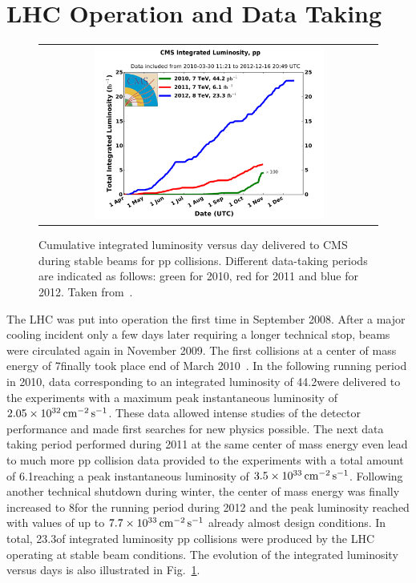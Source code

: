 \section{LHC Operation and Data Taking}
\label{sec:data}
\begin{figure}[!tp]
  \centering
  \begin{tabular}{c}
    \includegraphics[width=0.7\textwidth]{figures/int_lumi_cumulative_pp_2.pdf}
  \end{tabular}
  \caption{Cumulative integrated luminosity versus day delivered to CMS during stable beams for pp collisions. Different data-taking periods are indicated as follows: green for 2010, red for 2011 and blue for 2012. Taken from~\cite{bib:lhc:lumi12}.}
  \label{fig:lhc_data}
\end{figure}
The LHC was put into operation the first time in September 2008. After a major cooling incident only a few days later requiring a longer technical stop, beams were circulated again in November 2009. The first collisions at a center of mass energy of 7\tev finally took place end of March 2010~\cite{bib:lhcmachineoutreach}. In the following running period in 2010, data corresponding to an integrated luminosity of 44.2\pbinv were delivered to the experiments with a maximum peak instantaneous luminosity of $2.05 \times 10^{32} \,\text{cm}^{-2} \,\text{s}^{-1}$. These data allowed intense studies of the detector performance and made first searches for new physics possible. The next data taking period performed during 2011 at the same center of mass energy even lead to much more pp collision data provided to the experiments with a total amount of 6.1\fbinv reaching a peak instantaneous luminosity of $3.5 \times 10^{33} \,\text{cm}^{-2} \,\text{s}^{-1}$. Following another technical shutdown during winter, the center of mass energy was finally increased to 8\tev for the running period during 2012 and the peak luminosity reached with values of up to $7.7 \times 10^{33} \,\text{cm}^{-2} \,\text{s}^{-1}$ already almost design conditions. In total, 23.3\fbinv of integrated luminosity pp collisions were produced by the LHC operating at stable beam conditions. The evolution of the integrated luminosity versus days is also illustrated in Fig.~\ref{fig:lhc_data}. \\
